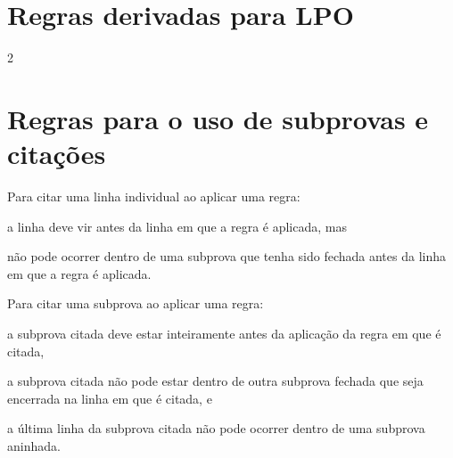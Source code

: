 \section{Regras derivadas para LPO}

\begin{multicols}{2}
\begin{fitchproof}
\end{fitchproof}
\begin{fitchproof}
\end{fitchproof}
\begin{fitchproof}
\end{fitchproof}
\begin{fitchproof}
\end{fitchproof}
\end{multicols}

\section{Regras para o uso de subprovas e citações}

Para citar uma linha individual ao aplicar uma regra:
\begin{compactlist}
\item a linha deve vir antes da linha em que a regra é aplicada, mas
\item não pode ocorrer dentro de uma subprova que tenha sido fechada antes da linha em que a regra é aplicada.
\end{compactlist}
Para citar uma subprova ao aplicar uma regra:
\begin{compactlist}
\item a subprova citada deve estar inteiramente antes da aplicação da regra em que é citada,
\item a subprova citada não pode estar dentro de outra subprova fechada que seja encerrada na linha em que é citada, e
\item a última linha da subprova citada não pode ocorrer dentro de uma subprova aninhada.
\end{compactlist}

